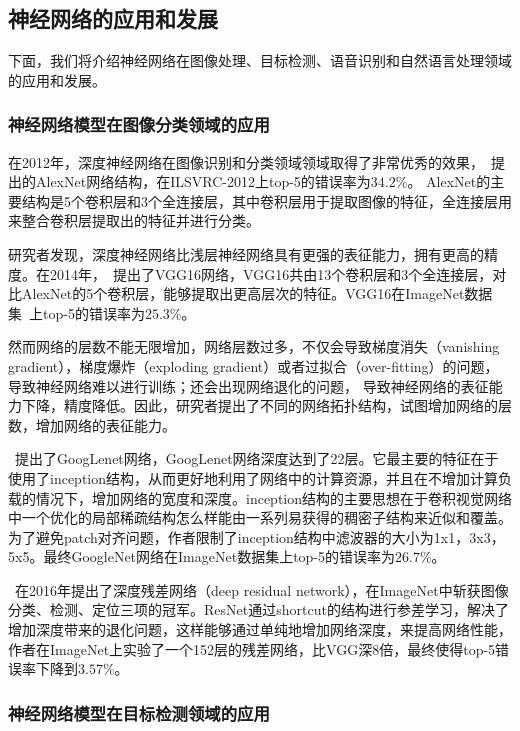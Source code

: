 \subsection{神经网络的应用和发展}

下面，我们将介绍神经网络在图像处理、目标检测、语音识别和自然语言处理领域的应用和发展。

\subsubsection{神经网络模型在图像分类领域的应用}
在2012年，深度神经网络在图像识别和分类领域领域取得了非常优秀的效果，~\citet{krizhevsky2012imagenet}提出的AlexNet网络结构，在ILSVRC-2012上top-5的错误率为$34.2\%$。 
AlexNet的主要结构是5个卷积层和3个全连接层，其中卷积层用于提取图像的特征，全连接层用来整合卷积层提取出的特征并进行分类。

研究者发现，深度神经网络比浅层神经网络具有更强的表征能力，拥有更高的精度。在2014年，~\citet{simonyan2014very}提出了VGG16网络，VGG16共由13个卷积层和3个全连接层，对比AlexNet的5个卷积层，能够提取出更高层次的特征。VGG16在ImageNet数据集~\cite{deng2009imagenet}上top-5的错误率为$25.3\%$。

然而网络的层数不能无限增加，网络层数过多，不仅会导致梯度消失（vanishing gradient），梯度爆炸（exploding gradient）或者过拟合（over-fitting）的问题，导致神经网络难以进行训练；还会出现网络退化的问题，
导致神经网络的表征能力下降，精度降低。因此，研究者提出了不同的网络拓扑结构，试图增加网络的层数，增加网络的表征能力。

~\citet{szegedy2015going}提出了GoogLenet网络，GoogLenet网络深度达到了22层。它最主要的特征在于使用了inception结构，从而更好地利用了网络中的计算资源，并且在不增加计算负载的情况下，增加网络的宽度和深度。inception结构的主要思想在于卷积视觉网络中一个优化的局部稀疏结构怎么样能由一系列易获得的稠密子结构来近似和覆盖。为了避免patch对齐问题，作者限制了inception结构中滤波器的大小为1x1，3x3，5x5。最终GoogleNet网络在ImageNet数据集上top-5的错误率为$26.7\%$。

~\citet{he2016deep}在2016年提出了深度残差网络（deep residual network），在ImageNet中斩获图像分类、检测、定位三项的冠军。ResNet通过shortcut的结构进行参差学习，解决了增加深度带来的退化问题，这样能够通过单纯地增加网络深度，来提高网络性能，作者在ImageNet上实验了一个152层的残差网络，比VGG深8倍，最终使得top-5错误率下降到$3.57\%$。

\subsubsection{神经网络模型在目标检测领域的应用}

